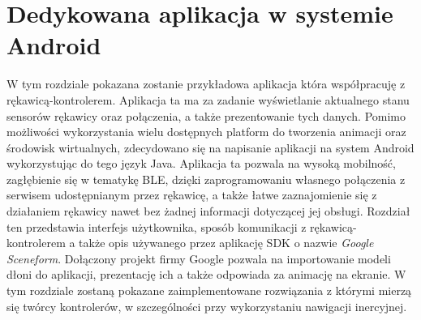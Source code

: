 \chapter{Dedykowana aplikacja w systemie Android}
\label{ch:aplikacja}
W tym rozdziale pokazana zostanie przykładowa aplikacja która współpracuję z rękawicą-kontrolerem. Aplikacja ta ma za zadanie wyświetlanie aktualnego stanu sensorów rękawicy oraz połączenia, a także prezentowanie tych danych. Pomimo możliwości wykorzystania wielu dostępnych platform do tworzenia animacji oraz środowisk wirtualnych, zdecydowano się na napisanie aplikacji na system Android wykorzystując do tego język Java. Aplikacja ta pozwala na wysoką mobilność, zagłębienie się w tematykę BLE, dzięki zaprogramowaniu własnego połączenia z serwisem udostępnianym przez rękawicę, a także łatwe zaznajomienie się z działaniem rękawicy nawet bez żadnej informacji dotyczącej jej obsługi. Rozdział ten przedstawia interfejs użytkownika, sposób komunikacji z rękawicą-kontrolerem a także opis używanego przez aplikację SDK o nazwie \textit{Google Sceneform}. Dołączony projekt firmy Google pozwala na importowanie modeli dłoni do aplikacji, prezentację ich a także odpowiada za animację na ekranie. W tym rozdziale zostaną pokazane zaimplementowane rozwiązania z którymi mierzą się twórcy kontrolerów, w szczególności przy wykorzystaniu nawigacji inercyjnej.

